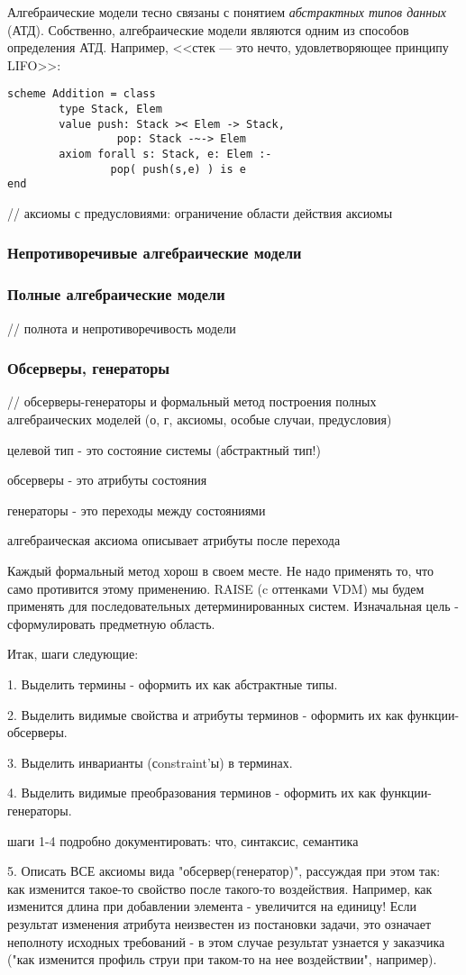 \documentclass[14pt, twoside]{extreport}
\newcommand{\head}[1]{\vspace{1cm}\subsubsection*{#1}}
\begin{document}
Алгебраические модели тесно связаны с понятием \emph{абстрактных типов данных} (АТД). Собственно, алгебраические модели являются одним из способов определения АТД. Например, <<стек --- это нечто, удовлетворяющее принципу LIFO>>:
\begin{lstlisting}
scheme Addition = class
        type Stack, Elem
        value push: Stack >< Elem -> Stack,
                 pop: Stack -~-> Elem
        axiom forall s: Stack, e: Elem :-
                pop( push(s,e) ) is e
end
\end{lstlisting}

// аксиомы с предусловиями: ограничение области действия аксиомы

\head{Непротиворечивые алгебраические модели}

\head{Полные алгебраические модели}

// полнота и непротиворечивость модели

\head{Обсерверы, генераторы}

// обсерверы-генераторы и формальный метод построения полных алгебраических моделей (о, г, аксиомы, особые случаи, предусловия)

целевой тип - это состояние системы (абстрактный тип!)

обсерверы - это атрибуты состояния

генераторы - это переходы между состояниями

алгебраическая аксиома описывает атрибуты после перехода

Каждый формальный метод хорош в своем месте. Не надо применять то, что само противится этому применению. RAISE (c оттенками VDM) мы будем применять для последовательных детерминированных систем. Изначальная цель - сформулировать предметную область.

Итак, шаги следующие:

1. Выделить термины - оформить их как абстрактные типы.

2. Выделить видимые свойства и атрибуты терминов - оформить их как функции-обсерверы.

3. Выделить инварианты (сonstraint'ы) в терминах.

4. Выделить видимые преобразования терминов - оформить их как функции-генераторы.

шаги 1-4 подробно документировать: что, синтаксис, семантика

5. Описать ВСЕ аксиомы вида "обсервер(генератор)", рассуждая при этом так: как изменится такое-то свойство после такого-то воздействия. Например, как изменится длина при добавлении элемента - увеличится на единицу! Если результат изменения атрибута неизвестен из постановки задачи, это означает неполноту исходных требований - в этом случае результат узнается у заказчика ("как изменится профиль струи при таком-то на нее воздействии", например).
\end{document}
